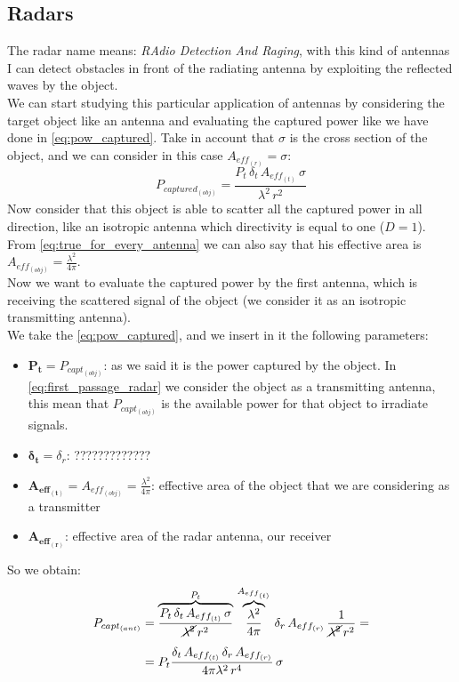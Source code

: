 \subsection*{Radars}
The radar name means: \emph{RAdio Detection And Raging}, with this kind of antennas I can detect obstacles in front of the radiating antenna by exploiting the reflected waves by the object.\\
We can start studying this particular application of antennas by considering the target object like an antenna and evaluating the captured power like we have done in \cref{eq:pow_captured}. Take in account that $\sigma$ is the cross section of the object, and we can consider in this case $A_{eff_{(r)}}=\sigma$:
\begin{equation}
    P_{captured_{(obj)}}=\frac{P_t\,\delta_t\,A_{eff_{(t)}}\,\sigma}{\lambda^2\,r^2}
\end{equation}
Now consider that this object is able to scatter all the captured power in all direction, like an isotropic antenna which directivity is equal to one ($D = 1$). From \cref{eq:true_for_every_antenna} we can also say that his effective area is $A_{eff_{(obj)}}=\frac{\lambda^2}{4\pi}$.\\
Now we want to evaluate the captured power by the first antenna, which is receiving the scattered signal of the object (we consider it as an isotropic transmitting antenna).\\
We take the \cref{eq:pow_captured}, and we insert in it the following parameters:
\begin{itemize}
    \item $\bm{P_t}=P_{capt_{(obj)}}$: as we said it is the power captured by the object. In \cref{eq:first_passage_radar} we consider the object as a transmitting antenna, this mean that $P_{capt_{(obj)}}$ is the available power for that object to irradiate signals.
    \item $\bm{\delta_t}=\delta_{r}$: ?????????????
    \item $\bm{A_{{eff}_{(t)}}}=A_{eff_{(obj)}}=\frac{\lambda^2}{4\pi}$: effective area of the object that we are considering as a transmitter
    \item $\bm{A_{{eff}_{(r)}}}$: effective area of the radar antenna, our receiver
\end{itemize}
So we obtain:
\begin{align}\label{eq:first_passage_radar}
    \begin{split}
    P_{capt_{(ant)}}&=\overbrace{\frac{P_t\,\delta_t\,A_{eff_{(t)}}\,\sigma}{\cancel{\lambda^2}\,r^2}}^{P_t}\,\overbrace{\frac{\lambda^2}{4\pi}}^{A_{{eff}_{(t)}}}\,\delta_{r}\,A_{eff_{(r)}}\,\frac{1}{\cancel{\lambda^2}\,r^2}=\\[5pt]
    &=P_t\frac{\delta_t\,A_{eff_{(t)}}\,\delta_r\,A_{eff_{(r)}}}{4\pi\lambda^2\,r^4}\,\sigma
    \end{split}
\end{align}
